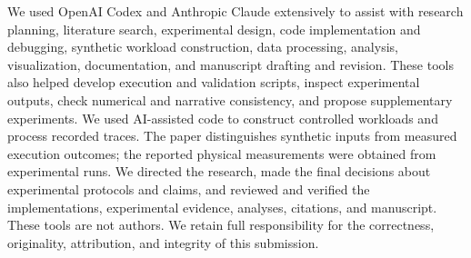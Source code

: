 We used OpenAI Codex and Anthropic Claude extensively to assist with research planning, literature search, experimental design, code implementation and debugging, synthetic workload construction, data processing, analysis, visualization, documentation, and manuscript drafting and revision. These tools also helped develop execution and validation scripts, inspect experimental outputs, check numerical and narrative consistency, and propose supplementary experiments. We used AI-assisted code to construct controlled workloads and process recorded traces. The paper distinguishes synthetic inputs from measured execution outcomes; the reported physical measurements were obtained from experimental runs. We directed the research, made the final decisions about experimental protocols and claims, and reviewed and verified the implementations, experimental evidence, analyses, citations, and manuscript. These tools are not authors. We retain full responsibility for the correctness, originality, attribution, and integrity of this submission.

